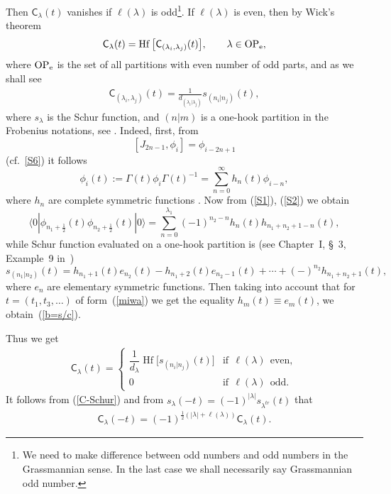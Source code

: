 \documentclass[pdftex]{sigma}
\numberwithin{equation}{section}
\newcommand{\Hf}{\mathop\mathrm{Hf}\nolimits}
\newcommand{\C}{\textsf{C}_}
\newcommand{\G}{\Gamma}
\renewcommand{\l}{\langle}
\renewcommand{\r}{\rangle}
\begin{document}
  Then $\textsf{C}_\lambda(t)$ vanishes if $\ell(\lambda)$ is
  odd\footnote{We need to make
 dif\/ference between odd numbers and odd numbers in the Grassmannian sense. In the
last case we shall necessarily say Grassmannian odd number.}. If
$\ell(\lambda)$ is even, then by Wick's theorem
\[
\textsf{C}_\lambda(t)=\Hf\big[
\textsf{C}_{(\lambda_i,\lambda_j)}(t)\big] ,\qquad \lambda\in
\rm OP_e ,
\]
 where $\rm OP_e$ is the set of all partitions with even number of
 odd parts, and as we shall see
  \begin{gather}\label{b=s/c}
\textsf{C}_{(\lambda_i,\lambda_j)}(t)= \frac
1{d_{(\lambda_i|\lambda_j)}} s_{(n_i|n_j)}(t),
  \end{gather}
where $s_\lambda$ is the Schur function, and $(n|m)$ is a one-hook
partition in the Frobenius notations, see \cite{Mac}. Indeed,
f\/irst, from
 \[
[J_{2n-1}, \phi_{i}]=\phi_{i-2n+1}
 \]
 (cf.~\eqref{S6})
 it follows
 \[
\phi_{i}(t)
:=\G(t)\phi_{i}\G(t)^{-1}=\sum_{n=0}^\infty h_{n}(t)\phi_{i-n},
 \]
where $h_n$ are complete symmetric functions \cite{Mac}. Now from
(\ref{S1}), (\ref{S2}) we obtain
 \[
\l 0|\phi_{n_1+\frac 12}(t)\phi_{n_2+\frac 12}(t)|0\r
=\sum_{n=0}^{\lambda_1} (-1)^{n_2-n}h_{n}(t)h_{n_1+n_2+1-n}(t),
 \]
 while  Schur function evaluated on a one-hook partition is (see Chapter~I, \S~3, Example~9 in~\cite{Mac})
 \[
s_{(n_1|n_2)}({t})= h_{n_1+1}({t}) e_{n_2}({t})- h_{n_1+2}({t})
e_{n_2-1}({t})+\cdots+ (-)^{n_2}h_{n_1+n_2+1}({t})  ,
 \]
where $e_n$ are elementary symmetric functions. Then taking into
account that for $t=(t_1,t_3,\dots)$ of form~(\ref{miwa}) we get
the equality $h_m({t})\equiv e_m({t})$,  we obtain~(\ref{b=s/c}).

Thus we get
 \begin{gather}\label{C-Schur}
 \textsf{C}_\lambda(t)=
\begin{cases}
 \dfrac{1}{d_\lambda} \Hf\big[
s_{(n_i|n_j)}(t)\big] &\mbox{if}\ \
\ell(\lambda)\ \ \mbox{even},\\
0 &\mbox{if}\ \ \ell(\lambda)\ \ \mbox{odd}.
 \end{cases}
 \end{gather}
It follows from (\ref{C-Schur}) and from
$s_\lambda(-t)=(-1)^{|\lambda|}s_{\lambda^{tr}}(t)$ that
 \begin{gather}\label{C(-t)}
\C\lambda(-t)=(-1)^{\frac
12(|\lambda|+\ell(\lambda))}\C\lambda(t).
 \end{gather}
\end{document}

